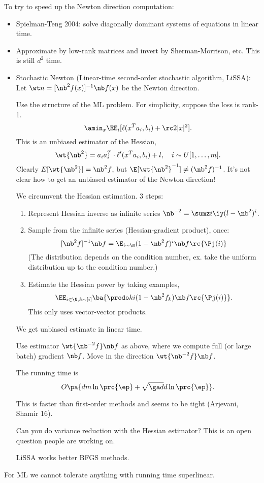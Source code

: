 To try to speed up the Newton direction computation:
\begin{itemize}
\item
Spielman-Teng 2004: solve diagonally dominant systems of equations in linear time.
\item
Approximate by low-rank matrices and invert by Sherman-Morrison, etc. This is still $d^2$ time.
\item
Stochastic Newton (Linear-time second-order stochastic algorithm, LiSSA): Let $\wt n= [\nb^2f(x)]^{-1}\nb f(x)$ be the Newton direction.

Use the structure of the ML problem. For simplicity, suppose the loss is rank-1.
$$
\amin_x \EE_{i}[\ell(x^Ta_i,b_i) + \rc 2|x|^2].
$$
This is an unbiased estimator of the Hessian,
$$
\wt{\nb^2} = a_ia_i^T \cdot \ell'(x^Ta_i,b_i) + l,\quad i\sim U[1,\ldots, m].
$$
Clearly $E[\wt{\nb^2}] = \nb^2f$, but $\E[\wt{\nb^2}^{-1}]\ne (\nb^2 f)^{-1}$. It's not clear how to get an unbiased estimator of the Newton direction!

We circumvent the Hessian estimation. 3 steps:
\begin{enumerate}
\item
Represent Hessian inverse as infinite series $\nb^{-2} = \sumz i{\iy} (l-\nb^2)^i$.
\item
Sample from the infinite series (Hessian-gradient product), once:
$$
[\nb^2f]^{-1}\nb  f = \E_{i\sim \N} (1-\nb^2f)^i \nb f\rc{\Pj(i)}
$$
(The distribution depends on the condition number, ex. take the uniform distribution up to the condition number.)
\item
Estimate the Hessian power by taking examples,
$$
\EE_{i\in \N, k\sim [i]} \ba{\prodo ki (1-\nb^2 f_k) \nb f\rc{\Pj(i)}}.
$$
This only uses vector-vector products.
\end{enumerate}
We get unbiased estimate in linear time.
\begin{alg}[LiSSA]
Use estimator $\wt{\nb^{-2}f}\nb f$ as above, where we compute full (or large batch) gradient $\nb f$. Move in the direction $\wt{\nb^{-2}f}\nb f$. 
\end{alg}


\begin{thm}
The running time is
$$
O\pa{dm \ln \prc{\ep} + \sqrt{\ga d} d \ln \prc{\ep}}.
$$
\end{thm}
This is faster than first-order methods %
and seems to be tight (Arjevani, Shamir 16).

Can you do variance reduction with the Hessian estimator? This is an open question people are working on.

LiSSA works better BFGS methods. %
\end{itemize}
For ML we cannot tolerate anything with running time superlinear.

